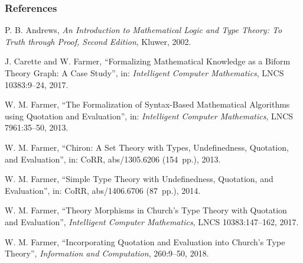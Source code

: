 \documentclass[t,12pt,numbers,fleqn]{beamer}
\begin{document}
\begin{frame}
\frametitle{References}
\bi

\footnotesize


  \item \bbrown{[And02]} P. B. Andrews, \emph{An Introduction to
    Mathematical Logic and Type Theory: To Truth through Proof, Second
    Edition}, Kluwer, 2002.

  \item \bbrown{[CarFar17]} J. Carette and W. Farmer, ``Formalizing
    Mathematical Knowledge as a Biform Theory Graph: A Case Study'',
    in: \emph{Intelligent Computer Mathematics}, LNCS 10383:9--24,
    2017.

  \item \bbrown{[Far13]} W. M. Farmer, ``The Formalization of
    Syntax-Based Mathematical Algorithms using Quotation and
    Evaluation'', in: \emph{Intelligent Computer Mathematics}, LNCS
    7961:35--50, 2013.

  \item \bbrown{[Far13a]} W. M. Farmer, ``Chiron: A Set Theory with
    Types, Undefinedness, Quotation, and Evaluation'', in: CoRR,
    abs/1305.6206 (154~pp.), 2013.

  \item \bbrown{[Far14]} W. M. Farmer, ``Simple Type Theory with Undefinedness,
    Quotation, and Evaluation'', in: CoRR,
    abs/1406.6706 (87~pp.), 2014.

  \item \bbrown{[Far17]} W. M. Farmer, ``Theory Morphisms in Church's
    Type Theory with Quotation and Evaluation'', \emph{Intelligent
      Computer Mathematics}, LNCS 10383:147--162, 2017.

  \item \bbrown{[Far18]} W. M. Farmer, ``Incorporating Quotation and
    Evaluation into Church's Type Theory'', \emph{Information and
      Computation}, 260:9--50, 2018.

\ei
\end{frame}

\end{document}
